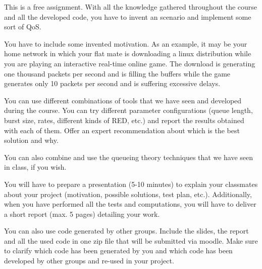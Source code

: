 This is a free assignment.
With all the knowledge gathered throughout the course and all the developed code, you have to invent an scenario and implement some sort of QoS.

You have to include some invented motivation.
As an example, it may be your home network in which your flat mate is downloading a linux distribution while you are playing an interactive real-time online game.
The download is generating one thousand packets per second and is filling the buffers while the game generates only 10 packets per second and is suffering excessive delays.

You can use different combinations of tools that we have seen and developed during the course.
You can try different parameter configurations (queue length, burst size, rates, different kinds of RED, etc.) and report the results obtained with each of them.
Offer an expert recommendation about which is the best solution and why.

You can also combine and use the queueing theory techniques that we have seen in class, if you wish.

You will have to prepare a presentation (5-10 minutes) to explain your classmates about your project (motivation, possible solutions, test plan, etc.).
Additionally, when you have performed all the tests and computations, you will have to deliver a short report (max. 5 pages) detailing your work.

You can also use code generated by other groups.
Include the slides, the report and all the used code in one zip file that will be submitted via moodle.
Make sure to clarify which code has been generated by you and which code has been developed by other groups and re-used in your project.

